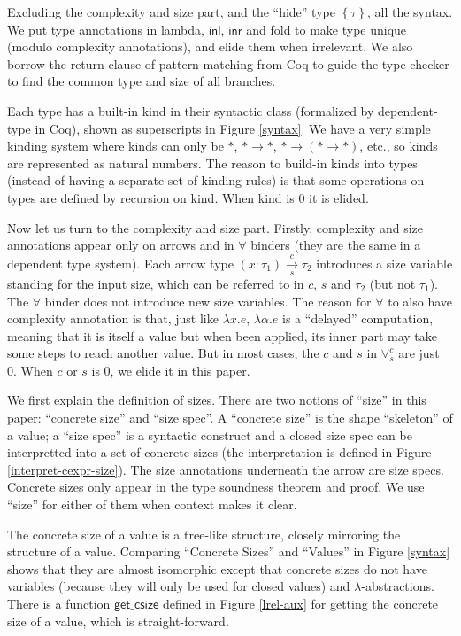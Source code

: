 \documentclass[preprint]{sigplanconf}
\newcommand{\thide}[1]{\left \{ #1 \right \}}
\newcommand{\arrow}[4]{#1\xrightarrow[#3]{#2}#4}
\newcommand{\syminl}{\mathsf{inl}}
\newcommand{\syminr}{\mathsf{inr}}
\newcommand{\getcsize}{\mathsf{get\_csize}}
\newcommand{\intro}[2]{(#1 : #2)}
\begin{document}
Excluding the complexity and size part, and the ``hide'' type $\thide{\tau}$, all the syntax. We put type annotations in lambda, $\syminl$, $\syminr$ and fold to make type unique (modulo complexity annotations), and elide them when irrelevant. We also borrow the return clause of pattern-matching from Coq to guide the type checker to find the common type and size of all branches. 

Each type has a built-in kind in their syntactic class (formalized by dependent-type in Coq), shown as superscripts in Figure \ref{syntax}. We have a very simple kinding system where kinds can only be $*$, $*\to *$, $*\to (*\to *)$, etc., so kinds are represented as natural numbers. The reason to build-in kinds into types (instead of having a separate set of kinding rules) is that some operations on types are defined by recursion on kind. When kind is 0 it is elided.

Now let us turn to the complexity and size part. Firstly, complexity and size annotations appear only on arrows and in $\forall$ binders (they are the same in a dependent type system). Each arrow type $\arrow{\intro{x}{\tau_1}}{c}{s}{\tau_2}$ introduces a size variable standing for the input size, which can be referred to in $c$, $s$ and $\tau_2$ (but not $\tau_1$). The $\forall$ binder does not introduce new size variables. The reason for $\forall$ to also have complexity annotation is that, just like $\lambda x.e$, $\lambda \alpha.e$ is a ``delayed'' computation, meaning that it is itself a value but when been applied, its inner part may take some steps to reach another value. But in most cases, the $c$ and $s$ in $\forall^c_s$ are just 0. When $c$ or $s$ is 0, we elide it in this paper.

We first explain the definition of sizes. There are two notions of ``size'' in this paper: ``concrete size'' and ``size spec''. A ``concrete size'' is the shape ``skeleton'' of a value; a ``size spec'' is a syntactic construct and a closed size spec can be interpretted into a set of concrete sizes (the interpretation is defined in Figure \ref{interpret-cexpr-size}). The size annotations underneath the arrow are size specs. Concrete sizes only appear in the type soundness theorem and proof. We use ``size'' for either of them when context makes it clear.

The concrete size of a value is a tree-like structure, closely mirroring the structure of a value. Comparing ``Concrete Sizes'' and ``Values'' in Figure \ref{syntax} shows that they are almost isomorphic except that concrete sizes do not have variables (because they will only be used for closed values) and $\lambda$-abstractions. There is a function $\getcsize$ defined in Figure \ref{lrel-aux} for getting the concrete size of a value, which is straight-forward.
\end{document}
